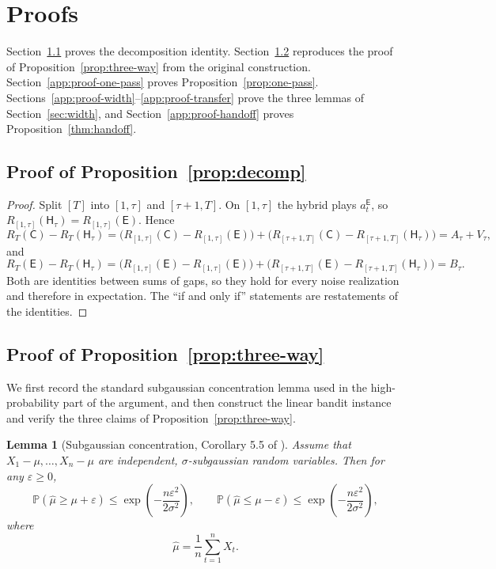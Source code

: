 \documentclass{article}
\newtheorem{lemma}{Lemma}
\theoremstyle{definition}
\theoremstyle{remark}
\theoremstyle{remark}
\newcommand{\Cold}{\mathsf{C}}
\newcommand{\Exp}{\mathsf{E}}
\newcommand{\Hyb}{\mathsf{H}}
\begin{document}
\section{Proofs}
\label{app:proofs}

Section~\ref{app:proof-decomp} proves the decomposition identity.
Section~\ref{app:proof-three-way} reproduces the proof of
Proposition~\ref{prop:three-way} from the original construction.
Section~\ref{app:proof-one-pass} proves Proposition~\ref{prop:one-pass}.
Sections~\ref{app:proof-width}--\ref{app:proof-transfer} prove the three
lemmas of Section~\ref{sec:width}, and Section~\ref{app:proof-handoff}
proves Proposition~\ref{thm:handoff}.

\subsection{Proof of Proposition~\ref{prop:decomp}}
\label{app:proof-decomp}

\begin{proof}
Split $[T]$ into $[1,\tau]$ and $[\tau+1,T]$. On $[1,\tau]$ the hybrid plays
$a_t^{\Exp}$, so $R_{[1,\tau]}(\Hyb_\tau)=R_{[1,\tau]}(\Exp)$. Hence
\[
R_T(\Cold)-R_T(\Hyb_\tau)
=\bigl(R_{[1,\tau]}(\Cold)-R_{[1,\tau]}(\Exp)\bigr)
+\bigl(R_{[\tau+1,T]}(\Cold)-R_{[\tau+1,T]}(\Hyb_\tau)\bigr)
=A_\tau+V_\tau ,
\]
and
\[
R_T(\Exp)-R_T(\Hyb_\tau)
=\bigl(R_{[1,\tau]}(\Exp)-R_{[1,\tau]}(\Exp)\bigr)
+\bigl(R_{[\tau+1,T]}(\Exp)-R_{[\tau+1,T]}(\Hyb_\tau)\bigr)
=B_\tau .
\]
Both are identities between sums of gaps, so they hold for every noise
realization and therefore in expectation. The ``if and only if'' statements
are restatements of the identities.
\end{proof}

\subsection{Proof of Proposition~\ref{prop:three-way}}
\label{app:proof-three-way}

We first record the standard subgaussian concentration lemma used in the
high-probability part of the argument, and then construct the linear bandit
instance and verify the three claims of Proposition~\ref{prop:three-way}.

\begin{lemma}[Subgaussian concentration, Corollary 5.5 of \cite{lattimore2020bandit}]
\label{lem:subgaussian}
Assume that $X_1-\mu,\dots,X_n-\mu$ are independent, $\sigma$-subgaussian random variables. Then for any $\varepsilon \ge 0$,
\[
\mathbb{P}\!\left(\hat{\mu} \ge \mu+\varepsilon\right)
\le
\exp\!\left(-\frac{n\varepsilon^2}{2\sigma^2}\right),
\qquad
\mathbb{P}\!\left(\hat{\mu} \le \mu-\varepsilon\right)
\le
\exp\!\left(-\frac{n\varepsilon^2}{2\sigma^2}\right),
\]
where
\[
\hat{\mu}=\frac{1}{n}\sum_{t=1}^n X_t.
\]
\end{lemma}
\end{document}
